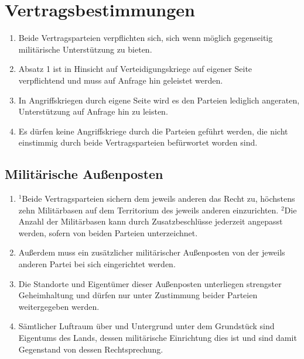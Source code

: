 \documentclass{article}
\begin{document}
\section{Vertragsbestimmungen}
\begin{enumerate}[(1)]
    \item Beide Vertragsparteien verpflichten sich, sich wenn möglich gegenseitig militärische Unterstützung zu bieten.
    \item Absatz 1 ist in Hinsicht auf Verteidigungskriege auf eigener Seite verpflichtend und muss auf Anfrage hin geleistet werden.
    \item In Angriffskriegen durch eigene Seite wird es den Parteien lediglich angeraten, Unterstützung auf Anfrage hin zu leisten.
    \item Es dürfen keine Angriffskriege durch die Parteien geführt werden, die nicht einstimmig durch beide Vertragsparteien befürwortet worden sind.
\end{enumerate}

\subsection{Militärische Außenposten}
\begin{enumerate}[(1)]
    \item ${^1}$Beide Vertragsparteien sichern dem jeweils anderen das Recht zu, höchstens zehn Militärbasen auf dem Territorium des jeweils anderen einzurichten. ${^2}$Die Anzahl der Militärbasen kann durch Zusatzbeschlüsse jederzeit angepasst werden, sofern von beiden Parteien unterzeichnet.
    \item Außerdem muss ein zusätzlicher militärischer Außenposten von der jeweils anderen Partei bei sich eingerichtet werden.
    \item Die Standorte und Eigentümer dieser Außenposten unterliegen strengster Geheimhaltung und dürfen nur unter Zustimmung beider Parteien weitergegeben werden.
    \item Sämtlicher Luftraum über und Untergrund unter dem Grundstück sind Eigentums des Lands, dessen militärische Einrichtung dies ist und sind damit Gegenstand von dessen Rechtsprechung.
\end{enumerate}
\end{document}
